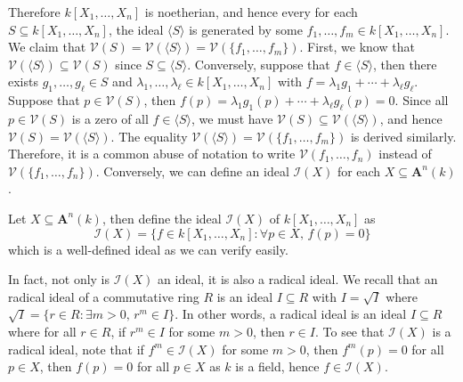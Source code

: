 \documentclass[11pt]{book}
\begin{document}
Therefore $k[X_1,\dots,X_n]$ is noetherian, and hence every for each $S\subseteq k[X_1,\dots,X_n]$, the ideal $\langle S\rangle$ is generated by some $f_1,\dots,f_m\in k[X_1,\dots,X_n]$. We claim that $\mathcal{V}(S)=\mathcal{V}(\langle S\rangle)=\mathcal{V}(\{f_1,\dots,f_m\})$. First, we know that $\mathcal{V}(\langle S\rangle)\subseteq \mathcal{V}(S)$ since $S\subseteq\langle S\rangle$. Conversely, suppose that $f\in\langle S\rangle$, then there exists $g_1,\dots,g_\ell\in S$ and $\lambda_1,\dots,\lambda_\ell\in k[X_1,\dots,X_n]$ with $f=\lambda_1g_1+\cdots+\lambda_{\ell}g_{\ell}$. Suppose that $p\in \mathcal{V}(S)$, then $f(p)=\lambda_1g_1(p)+\cdots+\lambda_{\ell}g_{\ell}(p)=0$. Since all $p\in \mathcal{V}(S)$ is a zero of all $f\in \langle S\rangle$, we must have $\mathcal{V}(S)\subseteq \mathcal{V}(\langle S\rangle)$, and hence $\mathcal{V}(S)=\mathcal{V}(\langle S\rangle)$. The equality $\mathcal{V}(\langle S\rangle)=\mathcal{V}(\{f_1,\dots,f_m\})$ is derived similarly. Therefore, it is a common abuse of notation to write $\mathcal{V}(f_1,\dots,f_n)$ instead of $\mathcal{V}(\{f_1,\dots,f_n\})$. Conversely, we can define an ideal $\mathcal{I}(X)$ for each $X\subseteq \mathbf A^n(k)$. 

\begin{definition}Let $X\subseteq \mathbf A^n(k)$, then define the ideal $\mathcal{I}(X)$ of $k[X_1,\dots,X_n]$ as 
\[\mathcal{I}(X)=\{f\in k[X_1,\dots,X_n]:\forall p\in X,\,f(p)=0\}\]
which is a well-defined ideal as we can verify easily.
\end{definition}
In fact, not only is $\mathcal{I}(X)$ an ideal, it is also a radical ideal. We recall that an radical ideal of a commutative ring $R$ is an ideal $I\subseteq R$ with $I=\sqrt{I}$ where $\sqrt{I}=\{r\in R:\exists m>0,\, r^m\in I\}$. In other words, a radical ideal is an ideal $I\subseteq R$ where for all $r\in R$, if $r^m\in I$ for some $m>0$, then $r\in I$. To see that $\mathcal{I}(X)$ is a radical ideal, note that if $f^m\in \mathcal{I}(X)$ for some $m>0$, then $f^m(p)=0$ for all $p\in X$, then $f(p)=0$ for all $p\in X$ as $k$ is a field, hence $f\in \mathcal{I}(X)$. 
\end{document}
